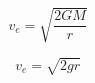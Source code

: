 \documentclass[10pt, a5paper]{article}
\begin{document}

$$
v_{e} = \sqrt{\dfrac{2 G M}{r}}
$$

$$
v_{e} = \sqrt{2gr}
$$


\end{document}
